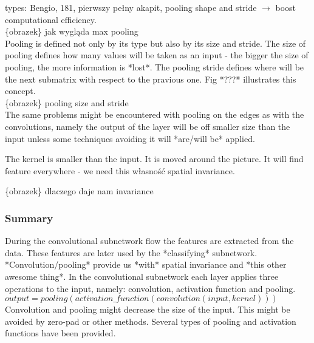\documentclass[a4paper,10pt]{report}
\begin{document}
	  types: Bengio, 181, pierwszy pełny akapit, pooling shape and stride $\rightarrow$ boost computational efficiency. \\

	  \{obrazek\} jak wygląda max pooling \\
	  
	  Pooling is defined not only by its type but also by its size and stride. The size of pooling defines how many values will be taken as an input - the bigger the size of pooling, the more information is *lost*. The pooling stride defines where will be the next submatrix with respect to the pravious one. Fig *???* illustrates this concept. \\
	  
	  \{obrazek\} pooling size and stride \\
	  
	  The same problems might be encountered with pooling on the edges as with the convolutions, namely the output of the layer will be off smaller size than the input unless some techniques avoiding it will *are/will be* applied.
	  
	   The kernel is smaller than the input. It is moved around the picture. It will find feature everywhere - we need this własność spatial invariance. %
	  
	  \{obrazek\} dlaczego daje nam invariance
	
	\subsubsection{Summary} %
	  During the convolutional subnetwork flow the features are extracted from the data. These features are later used by the *classifying* subnetwork. *Convolution/pooling* provide us *with* spatial invariance and *this other awesome thing*. In the convolutional subnetwork each layer applies three operations to the input, namely: convolution, activation function and pooling. \\ %
	  
	  $output = pooling(activation\_function(convolution(input, kernel)))$\\ %
	  
	  Convolution and pooling might decrease the size of the input. This might be avoided by zero-pad or other methods. Several types of pooling and activation functions have been provided. %
	  
\end{document}
